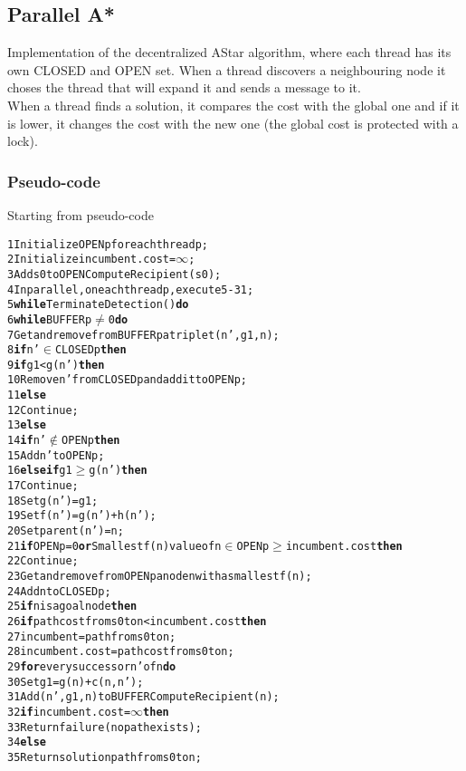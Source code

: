 \subsection{Parallel A*}

Implementation of the decentralized AStar algorithm, where each thread has its own CLOSED and OPEN set.
When a thread discovers a neighbouring node it choses the thread that will expand it and sends a message to it.
\\
When a thread finds a solution, it compares the cost with the global one and if it is lower, it changes the cost with the new one (the global cost is protected with a lock).

\subsubsection{Pseudo-code}

Starting from pseudo-code \cite{bibParAstar}

\begin{alltt}
    1 Initialize OPENp for each thread p;
    2 Initialize incumbent.cost = \(\infty\);
    3 Add s0 to OPENComputeRecipient(s0);
    4 In parallel, on each thread p, execute 5-31;
    5 {\bf while} TerminateDetection() {\bf do}
    6    {\bf while} BUFFERp \(\neq\) 0 {\bf do}
    7       Get and remove from BUFFERp a triplet (n', g1, n);
    8       {\bf if} n' \(\in\) CLOSEDp {\bf then}
    9           {\bf if} g1 < g(n') {\bf then}
    10              Remove n' from CLOSEDp and add it to OPENp;
    11          {\bf else}
    12              Continue;
    13      {\bf else}
    14          {\bf if} n' \(\notin\) OPENp {\bf then}
    15              Add n' to OPENp;
    16          {\bf else if} g1 \(\geq\) g(n') {\bf then}
    17              Continue;
    18      Set g(n') = g1;
    19      Set f(n') = g(n') + h(n');
    20      Set parent(n') = n;
    21   {\bf if} OPENp = 0 {\bf or} Smallest f(n) value of n \(\in\) OPENp \(\geq\) incumbent.cost {\bf then}
    22      Continue;
    23   Get and remove from OPENp a node n with a smallest f(n);
    24   Add n to CLOSEDp;
    25   {\bf if} n is a goal node {\bf then}
    26      {\bf if} path cost from s0 to n < incumbent.cost {\bf then}
    27          incumbent = path from s0 to n;
    28          incumbent.cost = path cost from s0 to n;
    29   {\bf for} every successor n' of n {\bf do}
    30      Set g1 = g(n) + c(n , n');
    31      Add (n', g1, n) to BUFFER ComputeRecipient(n);
    32 {\bf if} incumbent.cost = \(\infty\) {\bf then}
    33    Return failure (no path exists);
    34 {\bf else}
    35    Return solution path from s0 to n;
\end{alltt}

